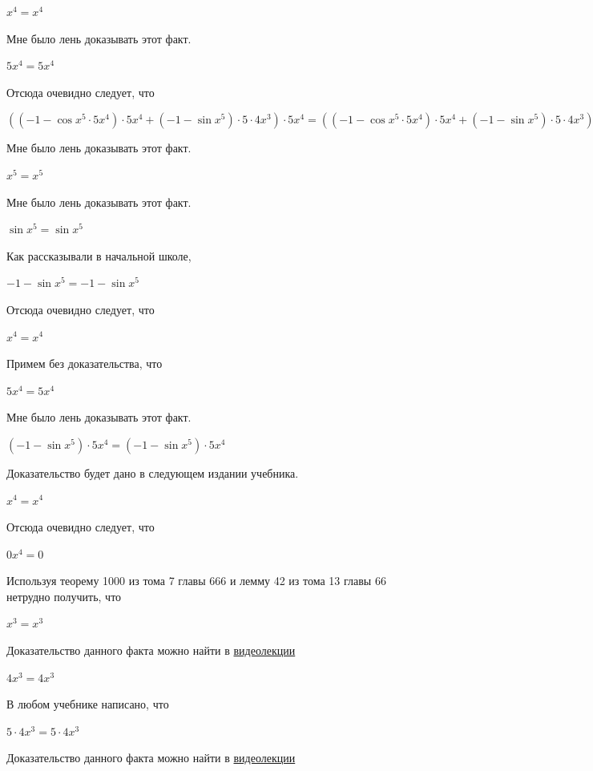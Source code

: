 \documentclass[12pt,a4paper,fleqn]{article}
\theoremstyle{definition}
\begin{document}
${ x }^{ 4 } = { x }^{ 4 }$

Мне было лень доказывать этот факт.

$ 5 { x }^{ 4 } =  5 { x }^{ 4 }$

Отсюда очевидно следует, что 

$(( -1  - \cos{ x }^{ 5 } \cdot  5 { x }^{ 4 }) \cdot  5 { x }^{ 4 } + ( -1  - \sin{ x }^{ 5 }) \cdot  5  \cdot  4 { x }^{ 3 }) \cdot  5 { x }^{ 4 } = (( -1  - \cos{ x }^{ 5 } \cdot  5 { x }^{ 4 }) \cdot  5 { x }^{ 4 } + ( -1  - \sin{ x }^{ 5 }) \cdot  5  \cdot  4 { x }^{ 3 }) \cdot  5 { x }^{ 4 }$

Мне было лень доказывать этот факт.

${ x }^{ 5 } = { x }^{ 5 }$

Мне было лень доказывать этот факт.

$\sin{ x }^{ 5 } = \sin{ x }^{ 5 }$

Как рассказывали в начальной школе, 

$ -1  - \sin{ x }^{ 5 } =  -1  - \sin{ x }^{ 5 }$

Отсюда очевидно следует, что 

${ x }^{ 4 } = { x }^{ 4 }$

Примем без доказательства, что 

$ 5 { x }^{ 4 } =  5 { x }^{ 4 }$

Мне было лень доказывать этот факт.

$( -1  - \sin{ x }^{ 5 }) \cdot  5 { x }^{ 4 } = ( -1  - \sin{ x }^{ 5 }) \cdot  5 { x }^{ 4 }$

Доказательство будет дано в следующем издании учебника. 

${ x }^{ 4 } = { x }^{ 4 }$

Отсюда очевидно следует, что 

$ 0 { x }^{ 4 } =  0 $

Используя теорему 1000 из тома 7 главы 666 и лемму 42 из тома 13 главы 66 нетрудно получить, что 

${ x }^{ 3 } = { x }^{ 3 }$

Доказательство данного факта можно найти в \href{https://www.youtube.com/watch?v=dQw4w9WgXcQ}{видеолекции} 

$ 4 { x }^{ 3 } =  4 { x }^{ 3 }$

В любом учебнике написано, что 

$ 5  \cdot  4 { x }^{ 3 } =  5  \cdot  4 { x }^{ 3 }$

Доказательство данного факта можно найти в \href{https://www.youtube.com/watch?v=dQw4w9WgXcQ}{видеолекции} 
\end{document}
